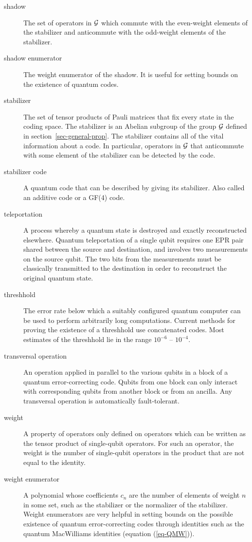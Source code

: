 \documentclass{report}
\newcommand{\G}{{\cal G}}
\begin{document}
\begin{description}
\item[shadow] The set of operators in $\G$ which commute with the 
even-weight elements of the stabilizer and anticommute with the odd-weight
elements of the stabilizer.

\item[shadow enumerator] The weight enumerator of the shadow.  It is useful
for setting bounds on the existence of quantum codes.

\item[stabilizer] The set of tensor products of Pauli matrices that fix
every state in the coding space.  The stabilizer is an Abelian subgroup
of the group $\G$ defined in section~\ref{sec-general-prop}.  The stabilizer
contains all of the vital information about a code.  In particular, operators
in $\G$ that anticommute with some element of the stabilizer can be
detected by the code.

\item[stabilizer code] A quantum code that can be described by giving its
stabilizer.  Also called an additive code or a GF(4) code.

\item[teleportation] A process whereby a quantum state is destroyed and exactly 
reconstructed elsewhere.  Quantum teleportation of a single qubit requires
one EPR pair shared between the source and destination, and involves two
measurements on the source qubit.  The two bits from the measurements must be 
classically transmitted to the destination in order to reconstruct the original 
quantum state. 

\item[threshhold] The error rate below which a suitably configured quantum
computer can be used to perform arbitrarily long computations.  Current
methods for proving the existence of a threshhold use concatenated codes.
Most estimates of the threshhold lie in the range $10^{-6}$ -- $10^{-4}$.

\item[transversal operation] An operation applied in parallel to the
various qubits in a block of a quantum error-correcting code.  Qubits
from one block can only interact with corresponding qubits from another
block or from an ancilla.  Any transversal operation is automatically
fault-tolerant.

\item[weight] A property of operators only defined on operators which
can be written as the tensor product of single-qubit operators.  For such
an operator, the weight is the number of single-qubit operators in the
product that are not equal to the identity.

\item[weight enumerator] A polynomial whose coefficients $c_n$ are the number
of elements of weight $n$ in some set, such as the stabilizer or
the normalizer of the stabilizer.  Weight enumerators are very helpful
in setting bounds on the possible existence of quantum error-correcting
codes through identities such as the quantum MacWilliams identities (equation
(\ref{eq-QMW})).

\end{description}
\end{document}
